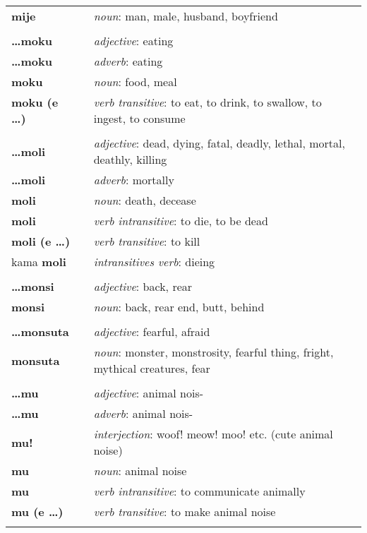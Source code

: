 \begin{supertabular}{p{2,5cm}|ll}
\textbf{mije} && \textit{noun}: man, male, husband, boyfriend \\ 
 && \\ %
\textbf{\dots moku} && \textit{adjective}: eating \\ 
\textbf{\dots moku} && \textit{adverb}: eating \\ 
\textbf{moku} && \textit{noun}: food, meal \\ 
\textbf{moku (e \dots)} && \textit{verb transitive}: to eat, to drink, to swallow, to ingest, to consume \\ 
 && \\ %
\textbf{\dots moli} && \textit{adjective}: dead, dying, fatal, deadly, lethal, mortal, deathly, killing \\ 
\textbf{\dots moli} && \textit{adverb}: mortally \\ 
\textbf{moli} && \textit{noun}: death, decease \\ 
\textbf{moli} && \textit{verb intransitive}: to die, to be dead \\ 
\textbf{moli (e \dots)} && \textit{verb transitive}: to kill \\ 
kama \textbf{moli} && \textit{intransitives verb}: dieing \\ 
 && \\ %
\textbf{\dots monsi} && \textit{adjective}: back, rear \\ 
\textbf{monsi} && \textit{noun}: back, rear end, butt, behind \\ 
 && \\ %
\textbf{\dots monsuta} && \textit{adjective}: fearful, afraid \\ 
\textbf{monsuta} && \textit{noun}: monster, monstrosity, fearful thing, fright, mythical creatures, fear \\ 
 && \\ %
\textbf{\dots mu} && \textit{adjective}: animal nois- \\ 
\textbf{\dots mu} && \textit{adverb}: animal nois- \\ 
\textbf{mu!} && \textit{interjection}: woof! meow! moo! etc. (cute animal noise) \\ 
\textbf{mu} && \textit{noun}: animal noise \\ 
\textbf{mu} && \textit{verb intransitive}: to communicate animally \\ 
\textbf{mu (e \dots)} && \textit{verb transitive}: to make animal noise \\ 
 && \\ %

\end{supertabular}
